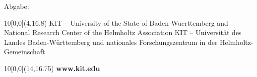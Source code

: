 \begin{titlepage}
\vspace{2cm}
\begin{center}
\large{Abgabe: \hspace*{0.25cm} \timeend}
\end{center}


\begin{textblock}{10}[0,0](4,16.8)
\tiny{ 
		{KIT -- University of the State of Baden-Wuerttemberg and National Research Center of the Helmholtz Association}
		{KIT -- Universit\"at des Landes Baden-W\"urttemberg und nationales Forschungszentrum in der Helmholtz-Gemeinschaft}
}
\end{textblock}

\begin{textblock}{10}[0,0](14,16.75)
\large{
	\textbf{www.kit.edu} 
}
\end{textblock}

\end{titlepage}
